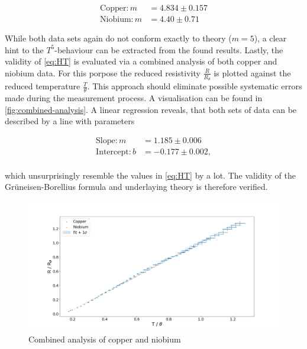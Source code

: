 \begin{align*}
\label{eq:fitparams-slope-metal}
\text{Copper}: m &= 4.834 \pm 0.157 \\
\text{Niobium}: m &= 4.40 \pm 0.71
\end{align*}

While both data sets again do not conform exactly to theory ($m=5$), a clear hint to the
$T^5$-behaviour can be extracted from the found results. Lastly, the validity of
\autoref{eq:HT} is evaluated via a combined analysis of both copper and niobium data.
For this porpose the reduced resistivity $\frac{R}{R_\theta}$ is plotted against the
reduced temperature $\frac{T}{\theta}$. This approach should eliminate possible
systematic errors made during the measurement process. A visualisation can be found
in \autoref{fig:combined-analysis}. A linear regression reveals, that both sets of
data can be described by a line with parameters

\begin{align*}
\text{Slope}: m &= 1.185\pm0.006 \\
\text{Intercept}: b &= -0.177\pm0.002, \\
\end{align*}

which unsurprisingly resemble the values in \autoref{eq:HT} by a lot. The validity of
the Grüneisen-Borellius formula and underlaying theory is therefore verified.

\begin{figure}
	\centering
	\includegraphics[width=1.0\textwidth]{./fig/combined_analysis.png}
	\caption{Combined analysis of copper and niobium}
	\label{fig:combined-analysis}
\end{figure}
